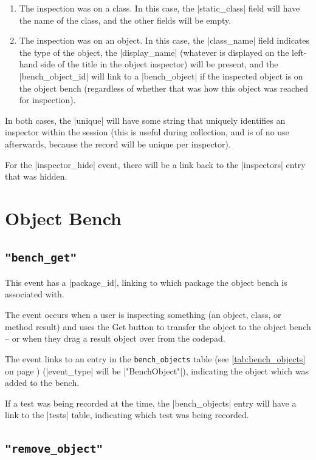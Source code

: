 \documentclass{report}
\newcommand{\myref}[1]{\autoref{#1} on page \pageref*{#1}}
\newcommand{\tabref}[1]{\lstinline|#1| table (see \myref{tab:#1})}
\begin{document}
\begin{enumerate}
\item The inspection was on a class.  In this case, the |static_class| field
  will have the name of the class, and the other fields will be empty.
\item The inspection was on an object.  In this case, the |class_name| field
  indicates the type of the object, the |display_name| (whatever is displayed
  on the left-hand side of the title in the object inspector) will be present,
  and the |bench_object_id| will link to a |bench_object| if the inspected
  object is on the object bench (regardless of whether that was how this
  object was reached for inspection).
\end{enumerate}

In both cases, the |unique| will have some string that uniquely identifies an
inspector within the session (this is useful during collection, and is of no
use afterwards, because the record will be unique per inspector).

For the |inspector_hide| event, there will be a link back to the |inspectors|
entry that was hidden.

\section{Object Bench}

\subsection{\lstinline!"bench_get"!}

This event has a |package_id|, linking to which package the object
bench is associated with.

The event occurs when a user is inspecting something (an object,
class, or method result) and uses the Get button to transfer the
object to the object bench -- or when they drag a result object over
from the codepad.
  
The event links to an entry in the \tabref{bench_objects} (|event_type| will
be |"BenchObject"|), indicating
the object which was added to the bench.

If a test was being recorded at the time, the |bench_objects| entry
will have a link to the |tests| table, indicating which test was being recorded.

\subsection{\lstinline!"remove_object"!}
\end{document}
